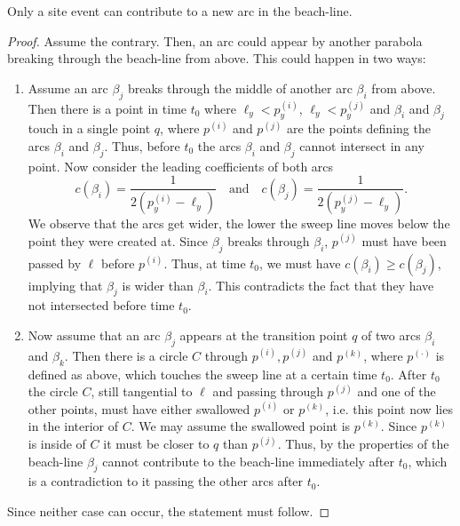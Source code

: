         \begin{lemma} 
            Only a site event can contribute to a new arc in the beach-line. 
        \end{lemma}
        \begin{proof} 
            Assume the contrary. Then, an arc could appear by another parabola breaking through the beach-line from above. This could happen in two ways:
            \begin{enumerate}
                \item Assume an arc $\beta_j$ breaks through the middle of another arc $\beta_i$ from above. Then there is a point in time $t_0$ where $\ell_y < p^{(i)}_y$, $\ell_y < p^{(j)}_y$ and $\beta_i$ and $\beta_j$ touch in a single point $q$, where $p^{(i)}$ and $p^{(j)}$ are the points defining the arcs $\beta_i$ and $\beta_j$. Thus, before $t_0$ the arcs $\beta_i$ and $\beta_j$ cannot intersect in any point. Now consider the leading coefficients of both arcs
                $$c(\beta_i) = \frac{1}{2(p^{(i)}_y - \ell_y)} \quad\text{and}\quad c(\beta_j) = \frac{1}{2(p^{(j)}_y - \ell_y)} .$$
                We observe that the arcs get wider, the lower the sweep line moves below the point they were created at. Since $\beta_j$ breaks through $\beta_i$, $p^{(j)}$ must have been passed by $\ell$ before $p^{(i)}$. Thus, at time $t_0$, we must have $c(\beta_i) \geq c(\beta_j)$, implying that $\beta_j$ is wider than $\beta_i$. This contradicts the fact that they have not intersected before time $t_0$.
                
                \item Now assume that an arc $\beta_j$ appears at the transition point $q$ of two arcs $\beta_i$ and $\beta_k$. Then there is a circle $C$ through $p^{(i)}, p^{(j)}$ and $p^{(k)}$, where $p^{(\cdot)}$ is defined as above, which touches the sweep line at a certain time $t_0$. After $t_0$ the circle $C$, still tangential to $\ell$ and passing through $p^{(j)}$ and one of the other points, must have either swallowed $p^{(i)}$ or $p^{(k)}$, i.e. this point now lies in the interior of $C$. We may assume the swallowed point is $p^{(k)}$. Since $p^{(k)}$ is inside of $C$ it must be closer to $q$ than $p^{(j)}$. Thus, by the properties of the beach-line $\beta_j$ cannot contribute to the beach-line immediately after $t_0$, which is a contradiction to it passing the other arcs after $t_0$.
            \end{enumerate}
            Since neither case can occur, the statement must follow.
        \end{proof}
        
